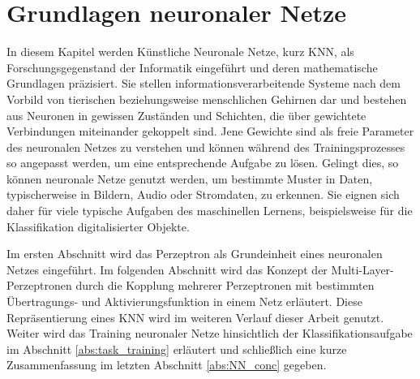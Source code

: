 \chapter{Grundlagen neuronaler Netze}
\label{kap:NN}

In diesem Kapitel werden Künstliche Neuronale Netze\cite{dayhoff1990neural}, kurz KNN, als Forschungsgegenstand der Informatik eingeführt und deren mathematische Grundlagen präzisiert. 
Sie stellen informationsverarbeitende Systeme nach dem Vorbild von tierischen beziehungsweise menschlichen Gehirnen dar und bestehen aus Neuronen in gewissen Zuständen und Schichten, die über gewichtete Verbindungen miteinander gekoppelt sind. Jene Gewichte sind als freie Parameter des neuronalen Netzes zu verstehen und können während des Trainingsprozesses so angepasst werden, um eine entsprechende Aufgabe zu lösen.  
Gelingt dies, so können neuronale Netze genutzt werden, um bestimmte Muster in Daten, typischerweise in Bildern, Audio oder Stromdaten, zu erkennen\cite{pandya1995pattern, pao1989adaptive, urbaniak2021quality}.
Sie eignen sich daher für viele typische Aufgaben des maschinellen Lernens, beispielsweise für die Klassifikation digitalisierter Objekte.

Im ersten Abschnitt wird das Perzeptron\cite{rosenblatt1958perceptron} als Grundeinheit eines neuronalen Netzes eingeführt. 
Im folgenden Abschnitt wird das Konzept der Multi-Layer-Perzeptronen\cite{werbos1988generalization} durch die Kopplung mehrerer Perzeptronen mit bestimmten Übertragungs- und Aktivierungsfunktion in einem Netz erläutert. Diese Repräsentierung eines KNN wird im weiteren Verlauf dieser Arbeit genutzt. Weiter wird das Training neuronaler Netze hinsichtlich der Klassifikationsaufgabe im Abschnitt \ref{abs:task_training} erläutert und schließlich eine kurze Zusammenfassung im letzten Abschnitt \ref{abs:NN_conc} gegeben.

